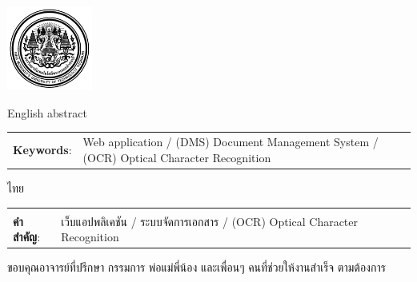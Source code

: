 \documentclass[12pt,oneside,openright,a4paper]{cpe-thai-project}
\begin{document}
\pdfstringdefDisableCommands{%
\let\MakeUppercase\relax
}

\begin{center}
  \includegraphics[width=2.8cm]{logo02.jpg}
\end{center}
\vspace*{-1cm}

\maketitlepage
\makesignaturepage 

\abstract

English abstract 

\begin{flushleft}
\begin{tabular*}{\textwidth}{@{}lp{}}
\textbf{Keywords}: & Web application / (DMS) Document Management System / (OCR) Optical Character Recognition
\end{tabular*}
\end{flushleft}
\endabstract

\thaiabstract

ไทย

\begin{flushleft}
\begin{tabular*}{\textwidth}{@{}lp{}}
 & \\

\textbf{คำสำคัญ}: & เว็บแอปพลิเคชัน / ระบบจัดการเอกสาร / (OCR) Optical Character Recognition
\end{tabular*}
\end{flushleft}
\endabstract


\preface
ขอบคุณอาจารย์ที่ปรึกษา กรรมการ พ่อแม่พี่น้อง และเพื่อนๆ คนที่ช่วยให้งานสำเร็จ ตามต้องการ
\end{document}
